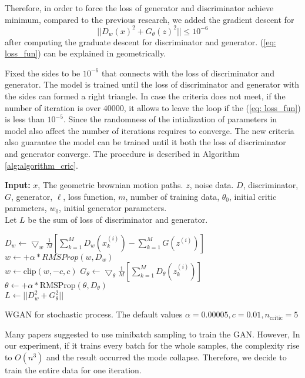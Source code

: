 \documentclass{article}
\begin{document}
	Therefore, in order to force the loss of generator and discriminator achieve minimum, compared to the previous research, we added the gradient descent for 
	\begin{equation}
	|| D_{w}(x)^{2} + G_{\theta}(z)^{2}|| \leq 10^{-6}
	\label{eq: loss_fun}
	\end{equation}
	after computing the graduate descent for discriminator and generator. 
	(\ref{eq: loss_fun}) can be explained in geometrically.
	
	Fixed the sides to be $10^{-6}$ that connects with the loss of discriminator and generator.
	The model is trained until the loss of discriminator and generator with the sides can formed a right triangle.
	In case the criteria does not meet, if the number of iteration is over $40000$, it allows to leave the loop if the (\ref{eq: loss_fun}) is less than $10^{-5}$.
	Since the randomness of the intialization of parameters in model also affect the number of iterations requires to converge. 
	The new criteria also guarantee the model can be trained until it both the loss of discriminator and generator converge.
	The procedure is described in Algorithm \ref{alg:algorithm_cric}.
	
	\begin{algorithm}
		\textbf{Input:} $x$, The geometric brownian motion paths. $z$, noise data. $D$, discriminator, $G$, generator, $\ell$, loss function, $m$, number of training data, $\theta_0$, initial critic parameters, $w_0$, initial generator parameters. \\
		Let $L$ be the sum of loss of discriminator and generator.
		{
			
			{
				{
					$D_w \leftarrow \bigtriangledown_{w}\frac{1}{M}[\sum_{k=1}^{M}D_{w}(x_{k}^{(i)})-\sum_{k=1}^{M}G(z^{(i)})]$ \\
					$w \leftarrow + \alpha*RMSProp(w,D_w)$ \\
					$w \leftarrow \text{clip}(w,-c,c)$
				}
				$G_\theta \leftarrow \bigtriangledown_{\theta}\frac{1}{M}[\sum_{k=1}^{M}D_{\theta}(z_{k}^{(i)})]$
				$\theta \leftarrow + \alpha*\text{RMSProp}(\theta,D_\theta)$  \\
				$L \leftarrow ||D_{w}^2 + G_{\theta}^2||$
			}
		}
		\caption{WGAN for stochastic process. The default values $\alpha = 0.00005, c=0.01, n_{\text{critic}}=5$}
		\label{alg:algorithm_cric}
	\end{algorithm} 
	
	Many papers suggested to use minibatch sampling to train the GAN. 
	However, In our experiment, if it trains every batch for the whole samples, the complexity rise to $O(n^3)$ and the result occurred the mode collapse. 
	Therefore, we decide to train the entire data for one iteration.
	
\end{document}

